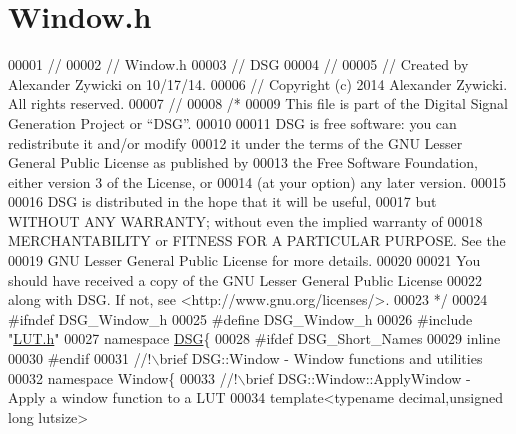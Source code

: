 \hypertarget{_window_8h_source}{\section{Window.\+h}
\label{_window_8h_source}
}

\begin{DoxyCode}
00001 \textcolor{comment}{//}
00002 \textcolor{comment}{//  Window.h}
00003 \textcolor{comment}{//  DSG}
00004 \textcolor{comment}{//}
00005 \textcolor{comment}{//  Created by Alexander Zywicki on 10/17/14.}
00006 \textcolor{comment}{//  Copyright (c) 2014 Alexander Zywicki. All rights reserved.}
00007 \textcolor{comment}{//}
00008 \textcolor{comment}{/*}
00009 \textcolor{comment}{ This file is part of the Digital Signal Generation Project or “DSG”.}
00010 \textcolor{comment}{}
00011 \textcolor{comment}{ DSG is free software: you can redistribute it and/or modify}
00012 \textcolor{comment}{ it under the terms of the GNU Lesser General Public License as published by}
00013 \textcolor{comment}{ the Free Software Foundation, either version 3 of the License, or}
00014 \textcolor{comment}{ (at your option) any later version.}
00015 \textcolor{comment}{}
00016 \textcolor{comment}{ DSG is distributed in the hope that it will be useful,}
00017 \textcolor{comment}{ but WITHOUT ANY WARRANTY; without even the implied warranty of}
00018 \textcolor{comment}{ MERCHANTABILITY or FITNESS FOR A PARTICULAR PURPOSE.  See the}
00019 \textcolor{comment}{ GNU Lesser General Public License for more details.}
00020 \textcolor{comment}{}
00021 \textcolor{comment}{ You should have received a copy of the GNU Lesser General Public License}
00022 \textcolor{comment}{ along with DSG.  If not, see <http://www.gnu.org/licenses/>.}
00023 \textcolor{comment}{ */}
00024 \textcolor{preprocessor}{#ifndef DSG\_Window\_h}
00025 \textcolor{preprocessor}{#define DSG\_Window\_h}
00026 \textcolor{preprocessor}{#include "\hyperlink{_l_u_t_8h}{LUT.h}"}
00027 \textcolor{keyword}{namespace }\hyperlink{namespace_d_s_g}{DSG}\{
00028 \textcolor{preprocessor}{#ifdef DSG\_Short\_Names}
00029     \textcolor{keyword}{inline}
00030 \textcolor{preprocessor}{#endif}
00031 \textcolor{comment}{    //!\(\backslash\)brief DSG::Window - Window functions and utilities}
00032 \textcolor{comment}{}    \textcolor{keyword}{namespace }Window\{\textcolor{comment}{}
00033 \textcolor{comment}{        //!\(\backslash\)brief DSG::Window::ApplyWindow - Apply a window function to a LUT}
00034 \textcolor{comment}{}        \textcolor{keyword}{template}<\textcolor{keyword}{typename} decimal,\textcolor{keywordtype}{unsigned} \textcolor{keywordtype}{long} lutsize>

\end{DoxyCode}
